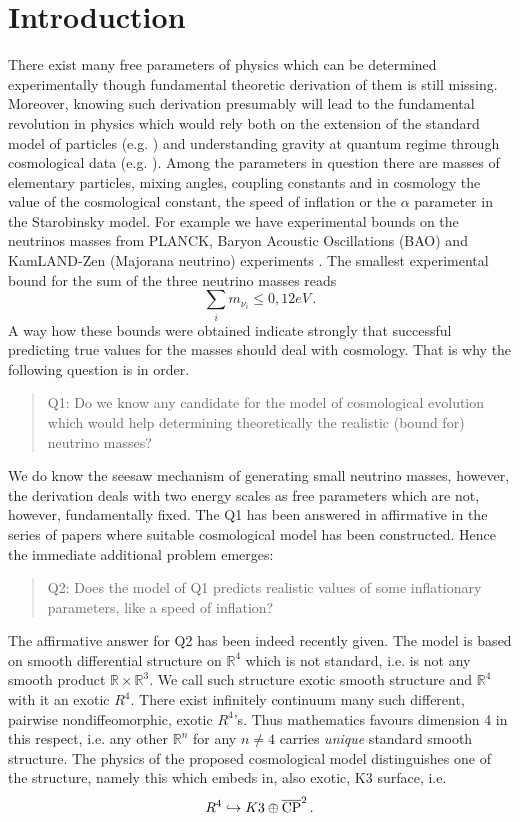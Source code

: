 \documentclass[12pt]{article}
\begin{document}
\section{Introduction}
There exist many free parameters of physics which can be determined experimentally though fundamental theoretic derivation of them is still missing. Moreover, knowing such derivation presumably will lead to the fundamental revolution in physics which would rely both on the extension of the standard model of particles (e.g. \cite{Weinberg2018}) and understanding gravity at quantum regime through cosmological data (e.g. \cite{Woodard2014}). Among the parameters in question there are masses of elementary particles, mixing angles, coupling constants and in cosmology the value of the cosmological constant, the speed of inflation or the $\alpha$ parameter in the Starobinsky model. For example we have experimental bounds on the neutrinos masses from PLANCK, Baryon Acoustic Oscillations (BAO) and KamLAND-Zen (Majorana neutrino) experiments \cite{Neutrino-mass-KmLAND-Zen2016,PlanckCosmoParam2015,Neutrino2015}. The smallest experimental bound for the sum of the three neutrino masses reads
\[ \sum_i m_{\nu_i}\leq 0,12eV\,.\]
A way how these bounds were obtained indicate strongly that successful predicting true values for the masses should deal with cosmology. That is why the following question is in order.
\begin{quotation}
Q1: Do we know any candidate for the model of cosmological evolution which would help determining theoretically the realistic (bound for) neutrino masses?    
\end{quotation}
We do know the seesaw mechanism of generating small neutrino masses, however, the derivation deals with two energy scales as free parameters which are not, however, fundamentally fixed. The Q1 has been answered in affirmative in the series of papers \cite{AK2018,AK2014,AK2019} where suitable cosmological model has been constructed. Hence the immediate additional problem emerges:
\begin{quotation}
Q2: Does the model of Q1 predicts realistic values of some inflationary parameters, like a speed of inflation?
\end{quotation}
The affirmative answer for Q2 has been indeed recently given. The model is based on smooth differential structure on $\mathbb{R}^4$ which is not standard, i.e. is not any smooth product $\mathbb{R}\times\mathbb{R}^3$. We call such structure exotic smooth structure and $\mathbb{R}^4$ with it an exotic $R^4$. There exist infinitely continuum many such different, pairwise nondiffeomorphic, exotic $R^4$'s. Thus mathematics favours dimension 4 in this respect, i.e. any other $\mathbb{R}^n$ for any $n\neq 4$ carries {\em unique} standard smooth structure. The physics of the proposed cosmological model distinguishes one of the structure, namely this which embeds in, also exotic, K3 surface, i.e.
\[R^4\hookrightarrow K3\oplus \overline{{\rm CP}}^2\,.  \]
\end{document}
